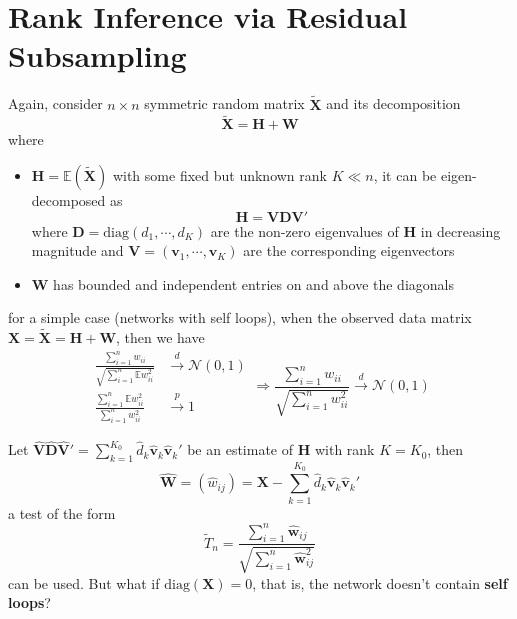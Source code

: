 \documentclass[twoside]{article}
\begin{document}
\section{Rank Inference via Residual Subsampling}
Again, consider $n\times n$ symmetric random matrix $\tilde{\mathbf{X}}$ and its decomposition 
\begin{equation*}
    \tilde{\mathbf{X}} = \mathbf{H+W}
\end{equation*}
where
\begin{itemize}
    \item $\mathbf{H} = \mathbb{E}\left(\tilde{\mathbf{X}}\right)$ with some fixed but unknown rank $K \ll n$, it can be eigen-decomposed as $$ \mathbf{H} = \mathbf{VDV}' $$ where $\mathbf{D} = \mathrm{diag}(d_1,\cdots,d_K)$ are the non-zero eigenvalues of $\mathbf{H}$ in decreasing magnitude and $\mathbf{V}= \left(\mathbf{v}_1,\cdots,\mathbf{v}_K\right)$ are the corresponding eigenvectors
    \item $\mathbf{W}$ has bounded and independent entries on and above the diagonals
\end{itemize}

for a simple case (networks with self loops), when the observed data matrix $\mathbf{X} = \tilde{\mathbf{X}} = \mathbf{H+W}$, then we have 
\begin{equation*}
    \begin{aligned}
        \frac{\sum^n_{i=1}w_{ii}}{\sqrt{\sum^n_{i=1}\mathbb{E}w_{ii}^2}}&\xrightarrow{d}\mathcal{N}(0,1) \\
        \frac{\sum^n_{i=1}\mathbb{E}w_{ii}^2}{\sum^n_{i=1}w^2_{ii}} &\xrightarrow{p} 1
    \end{aligned} \Rightarrow \frac{\sum^n_{i=1}w_{ii}}{\sqrt{\sum^n_{i=1}w_{ii}^2}}\xrightarrow{d}\mathcal{N}(0,1)
\end{equation*}

Let $\hat{\mathbf{V}}\hat{\mathbf{D}}\hat{\mathbf{V}}' = \sum^{K_0}_{k=1}\hat{d}_k \hat{\mathbf{v}}_k \hat{\mathbf{v}}_k'$ be an estimate of $\mathbf{H}$ with rank $K=K_0$, then 
\begin{equation*}
    \hat{\mathbf{W}} = \left(\hat{w}_{ij}\right) = \mathbf{X} - \sum^{K_0}_{k=1}\hat{d}_k \hat{\mathbf{v}}_k \hat{\mathbf{v}}_k'
\end{equation*}
a test of the form 
$$
\tilde{T}_n = \frac{\sum^n_{i=1}\hat{\mathbf{w}}_{ij}}{\sqrt{\sum^n_{i=1}\hat{\mathbf{w}}_{ij}^2}}
$$
can be used. But what if $\mathrm{diag}(\mathbf{X})=0$, that is, the network doesn't contain \textbf{self loops}?
\end{document}
